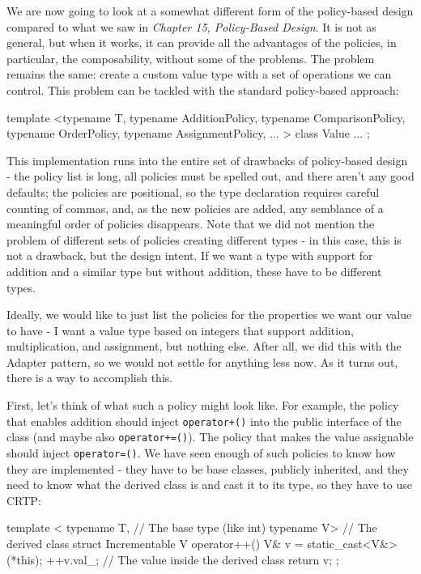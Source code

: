 We are now going to look at a somewhat different form of the policy-based design compared to what we saw in \emph{Chapter 15, Policy-Based Design}. It is not as general, but when it works, it can provide all the advantages of the policies, in particular, the composability, without some of the problems. The problem remains the same: create a custom value type with a set of operations we can control. This problem can be tackled with the standard policy-based approach:

\begin{code}
template <typename T, typename AdditionPolicy,
                      typename ComparisonPolicy,
                      typename OrderPolicy,
                      typename AssignmentPolicy, ... >
class Value { ... };
\end{code}

This implementation runs into the entire set of drawbacks of policy-based design - the policy list is long, all policies must be spelled out, and there aren't any good defaults; the policies are positional, so the type declaration requires careful counting of commas, and, as the new policies are added, any semblance of a meaningful order of policies disappears. Note that we did not mention the problem of different sets of policies creating different types - in this case, this is not a drawback, but the design intent. If we want a type with support for addition and a similar type but without addition, these have to be different types.

Ideally, we would like to just list the policies for the properties we want our value to have - I want a value type based on integers that support addition, multiplication, and assignment, but nothing else. After all, we did this with the Adapter pattern, so we would not settle for anything less now. As it turns out, there is a way to accomplish this.

First, let's think of what such a policy might look like. For example, the policy that enables addition should inject \texttt{operator+()} into the public interface of the class (and maybe also \texttt{operator+=()}). The policy that makes the value assignable should inject \texttt{operator=()}. We have seen enough of such policies to know how they are implemented - they have to be base classes, publicly inherited, and they need to know what the derived class is and cast it to its type, so they have to use CRTP:

\begin{code}
template <
  typename T,    // The base type (like int)
  typename V>    // The derived class
struct Incrementable {
  V operator++() {
    V& v = static_cast<V&>(*this);
    ++v.val_;     // The value inside the derived class
    return v;
  }
};
\end{code}

